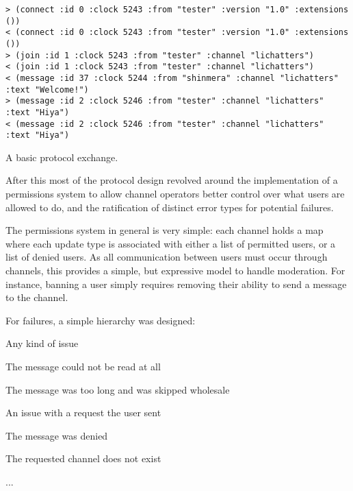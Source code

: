 \documentclass[format=sigconf]{acmart}
\begin{document}
\begin{listing}[h]
\begin{verbatim}
> (connect :id 0 :clock 5243 :from "tester" :version "1.0" :extensions ())
< (connect :id 0 :clock 5243 :from "tester" :version "1.0" :extensions ())
> (join :id 1 :clock 5243 :from "tester" :channel "lichatters")
< (join :id 1 :clock 5243 :from "tester" :channel "lichatters")
< (message :id 37 :clock 5244 :from "shinmera" :channel "lichatters" :text "Welcome!")
> (message :id 2 :clock 5246 :from "tester" :channel "lichatters" :text "Hiya")
< (message :id 2 :clock 5246 :from "tester" :channel "lichatters" :text "Hiya")
\end{verbatim}
\caption{A basic protocol exchange.}
\label{lst:basic-exchange}
\end{listing}

After this most of the protocol design revolved around the implementation of a permissions system to allow channel operators better control over what users are allowed to do, and the ratification of distinct error types for potential failures.

The permissions system in general is very simple: each channel holds a map where each update type is associated with either a list of permitted users, or a list of denied users. As all communication between users must occur through channels, this provides a simple, but expressive model to handle moderation. For instance, banning a user simply requires removing their ability to send a  message to the channel.

For failures, a simple hierarchy was designed:

\begin{step}
\item {} Any kind of issue
  \begin{step}
  \item {} The message could not be read at all
  \item {} The message was too long and was skipped wholesale
  \item {} An issue with a request the user sent
    \begin{step}
    \item {} The message was denied
    \item {} The requested channel does not exist
    \item ...
    \end{step}
  \end{step}
\end{step}
\end{document}
